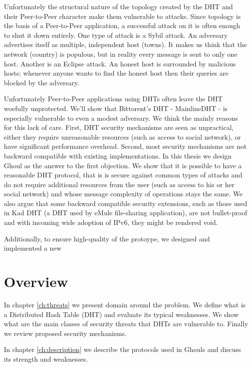 Unfortunately the structural nature of the topology created by the DHT and their
Peer-to-Peer character make them vulnerable to attacks.
Since topology is the basis of a Peer-to-Peer application, a successful attack
on it is often enough to shut it down entirely.
One type of attack is a Sybil attack.
An adversary advertises itself as multiple, independent host (towns).
It makes us think that the network (country) is populous, but in reality every
message is sent to only one host.
Another is an Eclipse attack.
An honest host is surrounded by malicious hosts; whenever anyone wants to find
the honest host then their queries are blocked by the adversary.

Unfortunately Peer-to-Peer applications using DHTs often leave the DHT woefully
unprotected.
We'll show that Bittorent's DHT - MainlineDHT - is especially vulnerable to even
a modest adversary.
We think the mainly reasons for this lack of care.
First, DHT security mechanisms are seen as unpractical, either they require
unreasonable resources (such as access to social network), or have significant
performance overhead.
Second, most security mechanisms are not backward compatible with existing
implementations.
In this thesis we design Ghoul as the answer to the first objection.
We show that it is possible to have a reasonable DHT protocol, that is is secure
against common types of attacks and do not require additional resources from the
user (such as access to his or her social network) and whose message
complexity of operations stays the same.
We also argue that some backward compatible security extensions, such as those
used in Kad DHT (a DHT used by eMule file-sharing application), are not
bullet-proof and with incoming wide adoption of IPv6, they might be rendered
void.

Additionally, to ensure high-quality of the protoype, we designed and
implemented a new 

\section{Overview}
In chapter \ref{ch:threats} we present domain around the problem.
We define what is a Distributed Hash Table (DHT) and evaluate its typical
weaknesses.
We show what are the main classes of security threats that DHTs are vulnerable
to.
Finally we review proposed security mechanisms.

In chapter \ref{ch:description} we describe the protocols used in Ghouls and
discuss its strength and weaknesses.

